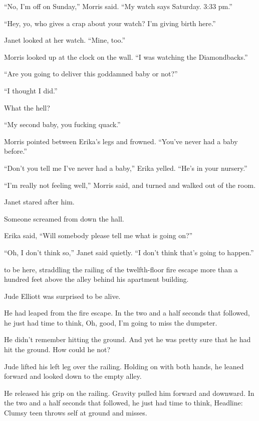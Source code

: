 ``No, I'm off on Sunday,'' Morris said. ``My watch says Saturday. 3:33 pm.''

``Hey, yo, who gives a crap about your watch? I'm giving birth here.''

Janet looked at her watch. ``Mine, too.''

Morris looked up at the clock on the wall. ``I was watching the Diamondbacks.''

``Are you going to deliver this goddamned baby or not?''

``I thought I did.''

What the hell?

``My second baby, you fucking quack.''

Morris pointed between Erika's legs and frowned. ``You've never had a baby before.''

``Don't you tell me I've never had a baby,'' Erika yelled. ``He's in your nursery.''

``I'm really not feeling well,'' Morris said, and turned and walked out of the room.

Janet stared after him.

Someone screamed from down the hall.

Erika said, ``Will somebody please tell me what is going on?''

``Oh, I don't think so,'' Janet said quietly. ``I don't think that's going to happen.''




 to be here, straddling the railing of the twelfth-floor fire escape more than a hundred feet above the alley behind his apartment building.

Jude Elliott was surprised to be alive.

He had leaped from the fire escape. In the two and a half seconds that followed, he just had time to think, Oh, good, I'm going to miss the dumpster.

He didn't remember hitting the ground. And yet he was pretty sure that he had hit the ground. How could he not?

Jude lifted his left leg over the railing. Holding on with both hands, he leaned forward and looked down to the empty alley.

He released his grip on the railing. Gravity pulled him forward and downward. In the two and a half seconds that followed, he just had time to think, Headline: Clumsy teen throws self at ground and misses.

